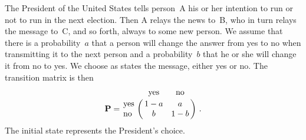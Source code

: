 \begin{example}\label{exam 11.1.2}
The President of the United States tells person~A his or her intention to run
or 
not to run in the next election.  Then A relays the news to~B, who in turn
relays 
the message to~C, and so forth, always to some new person.  We assume that
there is
a probability~$a$ that a person will change the answer from yes to no when
transmitting it to the next person and a probability~$b$ that he or she will
change it
from no to yes.  We choose as states the message, either yes or no.  The
transition matrix is then
$$
\mat{P} = \bordermatrix{
           & \mbox{yes} & \mbox{no} \cr
\mbox{yes} &      1 - a &         a \cr
\mbox{no}  &          b &     1 - b}\ .
$$
The initial state represents the President's choice.
\end{example}

